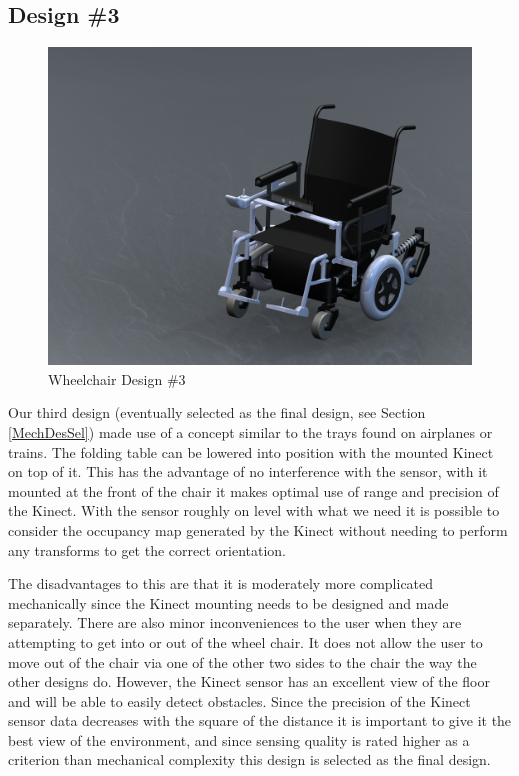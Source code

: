 \documentclass[oneside,final,a4paper]{report}
\begin{document}
\subsection{Design \#3}
\begin{figure}[hbt]
 \centering
 \includegraphics[scale=0.15]{WheelChair_Final}
 \caption{Wheelchair Design \#3}\label{fig:WheelChair_Final}
\end{figure}

Our third design (eventually selected as the final design, see Section \ref{MechDesSel}) made use of a concept similar to the trays found on airplanes or trains. The folding table can be lowered into position with the mounted Kinect on top of it. This has the advantage of no interference with the sensor, with it mounted at the front of the chair it makes optimal use of range and precision of the Kinect. With the sensor roughly on level with what we need it is possible to consider the occupancy map generated by the Kinect without needing to perform any transforms to get the correct orientation.

The disadvantages to this are that it is moderately more complicated mechanically since the Kinect mounting needs to be designed and made separately. There are also minor inconveniences to the user when they are attempting to get into or out of the wheel chair. It does not allow the user to move out of the chair via one of the other two sides to the chair the way the other designs do. However, the Kinect sensor has an excellent view of the floor and will be able to easily detect obstacles. Since the precision of the Kinect sensor data decreases with the square of the distance it is important to give it the best view of the environment, and since sensing quality is rated higher as a criterion than mechanical complexity this design is selected as the final design.
\end{document}
